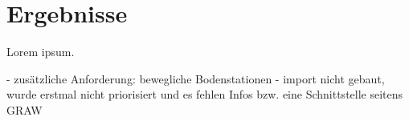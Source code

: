 \newpage


\section{Ergebnisse}

Lorem ipsum.\cite{laravel-nova-docs}


- zusätzliche Anforderung: bewegliche Bodenstationen
- import nicht gebaut, wurde erstmal nicht priorisiert und es fehlen Infos bzw. eine Schnittstelle seitens GRAW
